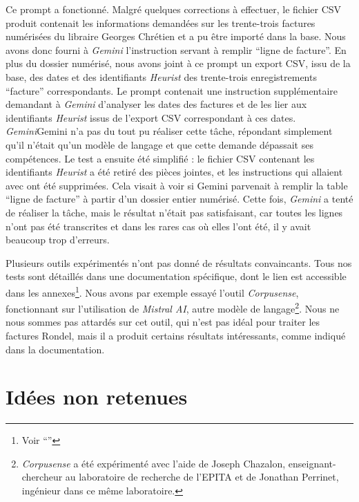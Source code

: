 Ce prompt a fonctionné. Malgré quelques corrections à effectuer, le fichier CSV produit contenait les informations demandées sur les trente-trois factures numérisées du libraire Georges Chrétien et a pu être importé dans la base. Nous avons donc fourni à \emph{Gemini} l'instruction servant à remplir \enquote{ligne de facture}. En plus du dossier numérisé, nous avons joint à ce prompt un export CSV, issu de la base, des dates et des identifiants \emph{Heurist} des trente-trois enregistrements \enquote{facture} correspondants. Le prompt contenait une instruction supplémentaire demandant à \emph{Gemini} d'analyser les dates des factures et de les lier aux identifiants \emph{Heurist} issus de l'export CSV correspondant à ces dates. \emph{Gemini}Gemini n'a pas du tout pu réaliser cette tâche, répondant simplement qu'il n'était qu'un modèle de langage et que cette demande dépassait ses compétences. Le test a ensuite été simplifié : le fichier CSV contenant les identifiants \emph{Heurist} a été retiré des pièces jointes, et les instructions qui allaient avec ont été supprimées. Cela visait à voir si Gemini parvenait à remplir la table \enquote{ligne de facture} à partir d'un dossier entier numérisé. Cette fois, \emph{Gemini} a tenté de réaliser la tâche, mais le résultat n'était pas satisfaisant, car toutes les lignes n'ont pas été transcrites et dans les rares cas où elles l'ont été, il y avait beaucoup trop d'erreurs. 

Plusieurs outils expérimentés n'ont pas donné de résultats convaincants. Tous nos tests sont détaillés dans une documentation spécifique, dont le lien est accessible dans les annexes\footnote{Voir \enquote{}}. Nous avons par exemple essayé l'outil \emph{Corpusense}, fonctionnant sur l'utilisation de \emph{Mistral AI}, autre modèle de langage\footnote{\emph{Corpusense} a été expérimenté avec l'aide de Joseph Chazalon, enseignant-chercheur au laboratoire de recherche de l'EPITA et de Jonathan Perrinet, ingénieur dans ce même laboratoire.}. Nous ne nous sommes pas attardés sur cet outil, qui n'est pas idéal pour traiter les factures Rondel, mais il a produit certains résultats intéressants, comme indiqué dans la documentation. 

\section{Idées non retenues}

